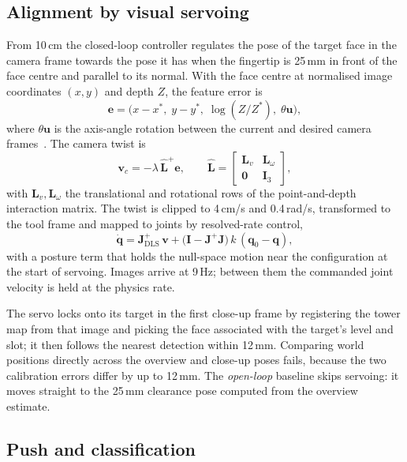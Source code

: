 \documentclass[conference]{IEEEtran}
\newcommand{\vect}[1]{\mathbf{#1}}
\begin{document}
\subsection{Alignment by visual servoing}

From 10\,cm the closed-loop controller regulates the pose of the target face in the
camera frame towards the pose it has when the fingertip is 25\,mm in front of the face
centre and parallel to its normal. With the face centre at normalised image
coordinates $(x,y)$ and depth $Z$, the feature error is
\begin{equation}
\vect{e} = \big(x-x^{*},\; y-y^{*},\; \log(Z/Z^{*}),\; \theta\vect{u}\big),
\end{equation}
where $\theta\vect{u}$ is the axis-angle rotation between the current and desired
camera frames~\cite{malis1999}. The camera twist is
\begin{equation}
\vect{v}_c = -\lambda\,\hat{\vect{L}}^{+}\vect{e},\qquad
\hat{\vect{L}} =
\begin{bmatrix}
\vect{L}_{v} & \vect{L}_{\omega}\\
\vect{0} & \vect{I}_3
\end{bmatrix},
\end{equation}
with $\vect{L}_v,\vect{L}_\omega$ the translational and rotational rows of the
point-and-depth interaction matrix. The twist is clipped to 4\,cm/s and 0.4\,rad/s,
transformed to the tool frame and mapped to joints by resolved-rate control,
\begin{equation}
\dot{\vect{q}} = \vect{J}^{+}_{\text{DLS}}\,\vect{v} + \big(\vect{I}-\vect{J}^{+}\vect{J}\big)\,k\,(\vect{q}_0-\vect{q}),
\end{equation}
with a posture term that holds the null-space motion near the configuration at the
start of servoing. Images arrive at 9\,Hz; between them the commanded joint velocity
is held at the physics rate.

The servo locks onto its target in the first close-up frame by registering the tower
map from that image and picking the face associated with the target's level and slot;
it then follows the nearest detection within 12\,mm. Comparing world positions
directly across the overview and close-up poses fails, because the two calibration
errors differ by up to 12\,mm. The \emph{open-loop} baseline skips servoing: it moves
straight to the 25\,mm clearance pose computed from the overview estimate.

\subsection{Push and classification}
\end{document}
